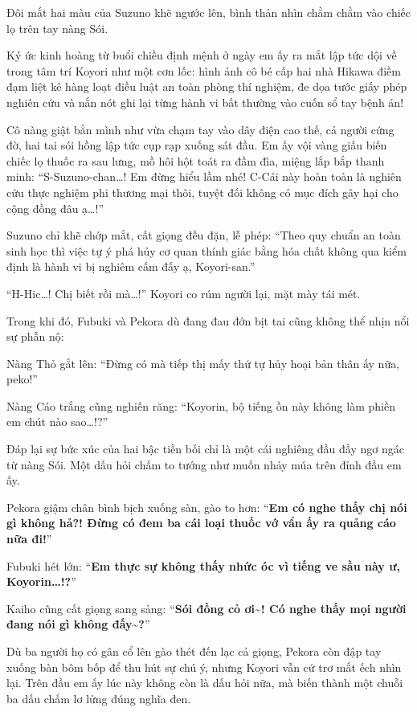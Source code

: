 \documentclass[../main.tex]{subfiles}
\begin{document}
Đôi mắt hai màu của Suzuno khẽ ngước lên, bình thản nhìn chằm chằm vào chiếc lọ trên tay nàng Sói.

Ký ức kinh hoàng từ buổi chiều định mệnh ở ngày em ấy ra mắt lập tức dội về trong tâm trí Koyori như một cơn lốc: hình ảnh cô bé cấp hai nhà Hikawa điềm đạm liệt kê hàng loạt điều luật an toàn phòng thí nghiệm, đe dọa tước giấy phép nghiên cứu và nắn nót ghi lại từng hành vi bất thường vào cuốn sổ tay bệnh án!

Cô nàng giật bắn mình như vừa chạm tay vào dây điện cao thế, cả người cứng đờ, hai tai sói hồng lập tức cụp rạp xuống sát đầu. Em ấy vội vàng giấu biến chiếc lọ thuốc ra sau lưng, mồ hôi hột toát ra đầm đìa, miệng lắp bắp thanh minh: ``S-Suzuno-chan\dots! Em đừng hiểu lầm nhé! C-Cái này hoàn toàn là nghiên cứu thực nghiệm phi thương mại thôi, tuyệt đối không có mục đích gây hại cho cộng đồng đâu ạ\dots!''

Suzuno chỉ khẽ chớp mắt, cất giọng đều đặn, lễ phép: ``Theo quy chuẩn an toàn sinh học thì việc tự ý phá hủy cơ quan thính giác bằng hóa chất không qua kiểm định là hành vi bị nghiêm cấm đấy ạ, Koyori-san.''

``H-Hic\dots! Chị biết rồi mà\dots!'' Koyori co rúm người lại, mặt mày tái mét.

Trong khi đó, Fubuki và Pekora dù đang đau đớn bịt tai cũng không thể nhịn nổi sự phẫn nộ:

Nàng Thỏ gắt lên: ``Đừng có mà tiếp thị mấy thứ tự hủy hoại bản thân ấy nữa, peko!''

Nàng Cáo trắng cũng nghiến răng: ``Koyorin, bộ tiếng ồn này không làm phiền em chút nào sao\dots!?''

Đáp lại sự bức xúc của hai bậc tiền bối chỉ là một cái nghiêng đầu đầy ngơ ngác từ nàng Sói. Một dấu hỏi chấm to tướng như muốn nhảy múa trên đỉnh đầu em ấy.

Pekora giậm chân bình bịch xuống sàn, gào to hơn: ``\textbf{Em có nghe thấy chị nói gì không hả?! Đừng có đem ba cái loại thuốc vớ vẩn ấy ra quảng cáo nữa đi!}''

Fubuki hét lớn: ``\textbf{Em thực sự không thấy nhức óc vì tiếng ve sầu này ư, Koyorin\dots!?}''

Kaiho cũng cất giọng sang sảng: ``\textbf{Sói đồng cỏ ơi\~{}! Có nghe thấy mọi người đang nói gì không đấy\~{}?}''

Dù ba người họ có gân cổ lên gào thét đến lạc cả giọng, Pekora còn đập tay xuống bàn bôm bốp để thu hút sự chú ý, nhưng Koyori vẫn cứ trơ mắt ếch nhìn lại. Trên đầu em ấy lúc này không còn là dấu hỏi nữa, mà biến thành một chuỗi ba dấu chấm lơ lửng đúng nghĩa đen.
\end{document}
